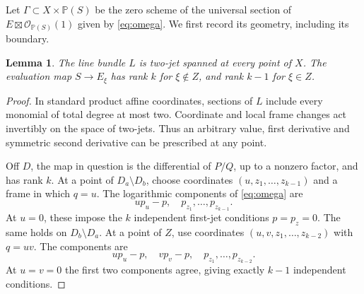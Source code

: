 \documentclass[11pt]{article}
\newtheorem{lemma}[theorem]{Lemma}
\newcommand{\PP}{\mathbb P}
\newcommand{\OO}{\mathcal O}
\begin{document}
Let $\Gamma\subset X\times\PP(S)$ be the zero scheme of the universal
section of $E\boxtimes\OO_{\PP(S)}(1)$ given by \eqref{eq:omega}.
We first record its geometry, including its boundary.

\begin{lemma}\label{lem:jets}
The line bundle $L$ is two-jet spanned at every point of $X$.
The evaluation map $S\to E_\xi$ has rank $k$ for $\xi\notin Z$,
and rank $k-1$ for $\xi\in Z$.
\end{lemma}
\begin{proof}
In standard product affine coordinates, sections of $L$ include every
monomial of total degree at most two. Coordinate and local frame
changes act invertibly on the space of two-jets. Thus an arbitrary
value, first derivative and symmetric second derivative can be
prescribed at any point.

Off $D$, the map in question is the differential of $P/Q$, up to a
nonzero factor, and has rank $k$. At a point of $D_a\setminus D_b$,
choose coordinates $(u,z_1,\ldots,z_{k-1})$ and a frame in which $q=u$.
The logarithmic components of \eqref{eq:omega} are
\[
 up_u-p,\quad p_{z_1},\ldots,p_{z_{k-1}}.
\]
At $u=0$, these impose the $k$ independent first-jet conditions
$p=p_z=0$. The same holds on $D_b\setminus D_a$.
At a point of $Z$, use coordinates $(u,v,z_1,\ldots,z_{k-2})$ with
$q=uv$. The components are
\begin{equation}\label{eq:cross}
 up_u-p,\quad vp_v-p,\quad p_{z_1},\ldots,p_{z_{k-2}}.
\end{equation}
At $u=v=0$ the first two components agree, giving exactly $k-1$
independent conditions.
\end{proof}
\end{document}
